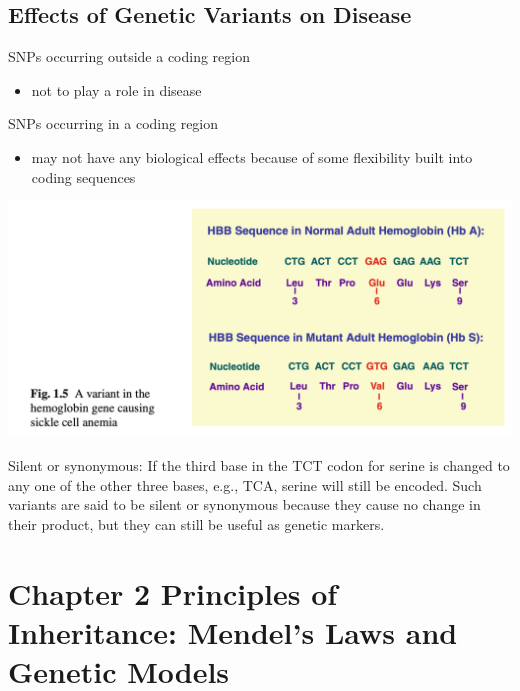 \documentclass[a4paper,twoside,11pt]{article}
\begin{document}
\subsection{Effects of Genetic Variants on Disease}
SNPs occurring outside a coding region
\begin{itemize}
    \item not to play a role in disease
\end{itemize}
SNPs occurring in a coding region
\begin{itemize}
    \item may not have any biological effects because of some flexibility built into coding sequences
\end{itemize}
\begin{center}
\includegraphics[scale=0.5]{figure4.png}
\end{center}
\textcolor{NavyBlue}{Silent or synonymous: }If the third base in the TCT codon for serine is changed to any one of the other three bases, e.g., TCA, serine will still be encoded. Such variants are said to be silent or synonymous because they cause no change in their product, but they can still be useful as genetic markers.
\section{Chapter 2 Principles of Inheritance: Mendel’s Laws and Genetic Models}
\end{document}
